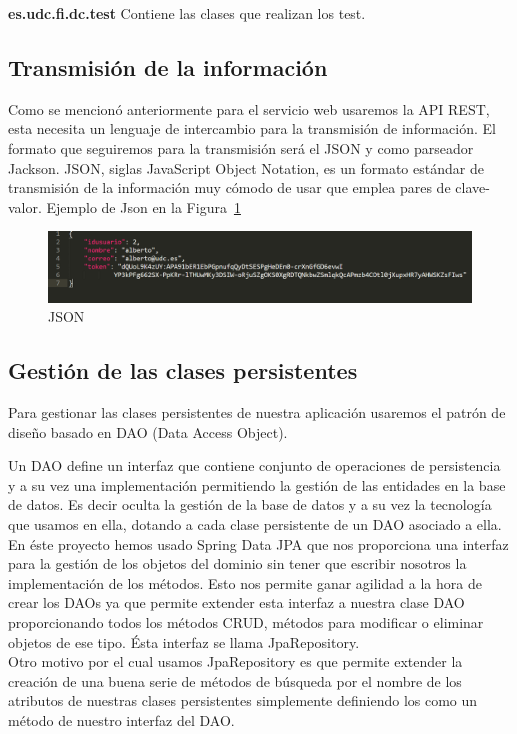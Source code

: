 \textbf{es.udc.fi.dc.test} Contiene las clases que realizan los test.
\subsection{Transmisión de la información}
Como se mencionó anteriormente para el servicio web usaremos la API REST, esta necesita un lenguaje de intercambio para la transmisión de información. El formato que seguiremos para la transmisión será el JSON y como parseador Jackson.
JSON, siglas JavaScript Object Notation, es un formato estándar de transmisión de la información muy cómodo de usar que emplea pares de clave-valor. 	Ejemplo de Json en la Figura~\ref{fig:json}
	\begin{figure}
		\centering
		\includegraphics[width=\textwidth] {json.PNG}
		\caption{JSON }
		\label{fig:json}
	\end{figure}
\subsection{Gestión de las clases persistentes}
Para gestionar las clases persistentes de nuestra aplicación usaremos el patrón de diseño basado en DAO (Data Access Object).

 Un DAO define un interfaz que contiene conjunto de operaciones de persistencia y a su vez una implementación permitiendo la gestión de las entidades en la base de datos. Es decir oculta la gestión de la base de datos y a su vez la tecnología que usamos en ella, dotando a cada clase persistente de un DAO asociado a ella. En éste proyecto hemos usado Spring Data JPA que nos proporciona una interfaz para la gestión de los objetos del dominio sin tener que escribir nosotros la implementación de los métodos. Esto nos permite ganar agilidad a la hora de crear los DAOs ya que permite extender esta interfaz a nuestra clase DAO proporcionando todos los métodos CRUD, métodos para modificar o eliminar objetos de ese tipo. Ésta interfaz se llama JpaRepository.\\


Otro motivo por el cual usamos JpaRepository es que permite extender la creación de una buena serie de métodos de búsqueda por el nombre de los atributos de nuestras clases persistentes simplemente definiendo los como un método de nuestro interfaz del DAO.
	
